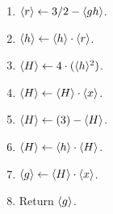 \begin{enumerate}
\begin{enumerate}
        \end{enumerate}
  \item $\langle r \rangle \leftarrow 3/2-\langle gh \rangle$.
  \item $\langle h \rangle \leftarrow \langle h \rangle \cdot \langle r \rangle$.
  \item $\langle H \rangle \leftarrow 4 \cdot (\langle h \rangle^2)$.
  \item $\langle H \rangle \leftarrow \langle H \rangle\cdot \langle x \rangle$.
  \item $\langle H \rangle \leftarrow (3) - \langle H \rangle$.
  \item $\langle H \rangle \leftarrow \langle h \rangle \cdot \langle H \rangle$.
  \item $\langle g \rangle \leftarrow \langle H \rangle \cdot \langle x \rangle$.
  \item Return $\langle g \rangle$.
\end{enumerate}

